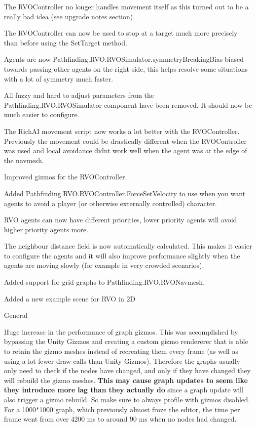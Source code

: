 \begin{DoxyItemize}
\begin{DoxyItemize}
\begin{DoxyItemize}
\begin{DoxyItemize}
\begin{DoxyItemize}
\item The R\+V\+O\+Controller no longer handles movement itself as this turned out to be a really bad idea (see upgrade notes section).
\item The R\+V\+O\+Controller can now be used to stop at a target much more precisely than before using the Set\+Target method.
\item Agents are now Pathfinding.\+R\+V\+O.\+R\+V\+O\+Simulator.\+symmetry\+Breaking\+Bias biased towards passing other agents on the right side, this helps resolve some situations with a lot of symmetry much faster.
\item All fuzzy and hard to adjust parameters from the Pathfinding.\+R\+V\+O.\+R\+V\+O\+Simulator component have been removed. It should now be much easier to configure.
\item The Rich\+AI movement script now works a lot better with the R\+V\+O\+Controller. Previously the movement could be drastically different when the R\+V\+O\+Controller was used and local avoidance didn\textquotesingle{}t work well when the agent was at the edge of the navmesh.
\item Improved gizmos for the R\+V\+O\+Controller.
\item Added Pathfinding.\+R\+V\+O.\+R\+V\+O\+Controller.\+Force\+Set\+Velocity to use when you want agents to avoid a player (or otherwise externally controlled) character.
\item R\+VO agents can now have different priorities, lower priority agents will avoid higher priority agents more.
\item The neighbour distance field is now automatically calculated. This makes it easier to configure the agents and it will also improve performance slightly when the agents are moving slowly (for example in very crowded scenarios).
\item Added support for grid graphs to Pathfinding.\+R\+V\+O.\+R\+V\+O\+Navmesh.
\item Added a new example scene for R\+VO in 2D 
\end{DoxyItemize}
\end{DoxyItemize}
\item General
\begin{DoxyItemize}
\item Huge increase in the performance of graph gizmos. This was accomplished by bypassing the Unity Gizmos and creating a custom gizmo rendererer that is able to retain the gizmo meshes instead of recreating them every frame (as well as using a lot fewer draw calls than Unity Gizmos). Therefore the graphs usually only need to check if the nodes have changed, and only if they have changed they will rebuild the gizmo meshes. {\bfseries{This may cause graph updates to seem like they introduce more lag than they actually do}} since a graph update will also trigger a gizmo rebuild. So make sure to always profile with gizmos disabled. For a 1000$\ast$1000 graph, which previously almost froze the editor, the time per frame went from over 4200 ms to around 90 ms when no nodes had changed. 

\end{DoxyItemize}
\end{DoxyItemize}
\end{DoxyItemize}
\end{DoxyItemize}
